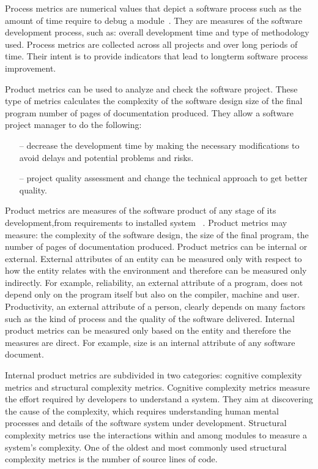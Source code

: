 Process metrics are numerical values that depict a software process such as the amount of time require to debug a module~\cite{metrics2}. They are measures of the software development process, such as: overall development time and type of methodology used. Process metrics are collected across all projects and over long periods of time. Their intent is to provide indicators that lead to longterm software process improvement.

Product metrics can be used to analyze and check the software project. These type of metrics calculates the complexity of the software design size of the final program number of pages of documentation produced. They allow a software project manager to do the following:

\begin{itemize}
	\item[--] decrease the development time by making the necessary modifications to avoid delays and potential problems and risks.
	\item[--] project quality assessment and change the technical approach to get better quality.
\end{itemize}

Product metrics are measures of the software product of any stage of its development,from requirements to installed system ~\cite{metrics2}. Product metrics may measure: the complexity of the software design, the size of the final program, the number of pages of documentation produced.
Product metrics can be internal or external. External attributes of an entity can be measured only with respect to how the entity relates with the environment and therefore can be measured only indirectly. For example, reliability, an external attribute of a program, does not depend only on the program itself but also on the compiler, machine and user. Productivity, an external attribute of a person, clearly depends on many factors such as the kind of process and the quality of the software delivered. Internal product metrics can be measured only based on the entity and therefore the measures are direct. For example, size is an internal attribute of any software document.

Internal product metrics are subdivided in two categories: cognitive
complexity metrics and structural complexity metrics. Cognitive complexity metrics measure the effort required by developers to understand a system. They aim at discovering the cause of the complexity, which requires understanding human mental processes and details of the software system under development. Structural complexity metrics use the interactions within and among modules to measure a system’s complexity. One of the oldest and most commonly used structural complexity metrics is the number of source lines of code.

